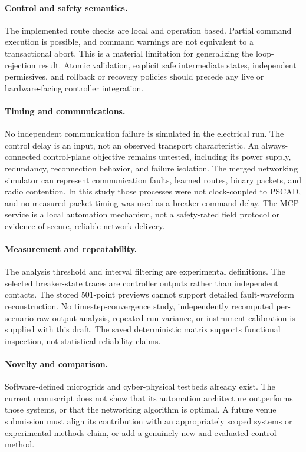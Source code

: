\paragraph{Control and safety semantics.}
The implemented route checks are local and operation based. Partial command
execution is possible, and command warnings are not equivalent to a
transactional abort. This is a material limitation for generalizing the
loop-rejection result. Atomic validation, explicit safe intermediate states,
independent permissives, and rollback or recovery policies should precede
any live or hardware-facing controller integration.

\paragraph{Timing and communications.}
No independent communication failure is simulated in the electrical run.
The control delay is an input, not an observed transport characteristic.
An always-connected control-plane objective remains untested, including its
power supply, redundancy, reconnection behavior, and failure isolation.
The merged networking simulator can represent communication faults, learned
routes, binary packets, and radio contention. In this study those processes
were not clock-coupled to PSCAD, and no measured packet timing was used as a
breaker command delay.
The MCP service is a local automation mechanism, not a safety-rated
field protocol or evidence of secure, reliable network delivery.

\paragraph{Measurement and repeatability.}
The analysis threshold and interval filtering are experimental definitions.
The selected breaker-state traces are controller outputs rather than
independent contacts. The stored 501-point previews cannot support detailed
fault-waveform reconstruction. No timestep-convergence study, independently
recomputed per-scenario raw-output analysis, repeated-run variance, or
instrument calibration is supplied with this draft. The saved deterministic
matrix supports functional inspection, not statistical reliability claims.

\paragraph{Novelty and comparison.}
Software-defined microgrids and cyber-physical testbeds already exist. The
current manuscript does not show that its automation architecture outperforms
those systems, or that the networking algorithm is optimal. A future venue
submission must align its contribution with an appropriately scoped systems
or experimental-methods claim, or add a genuinely new and evaluated control
method.

